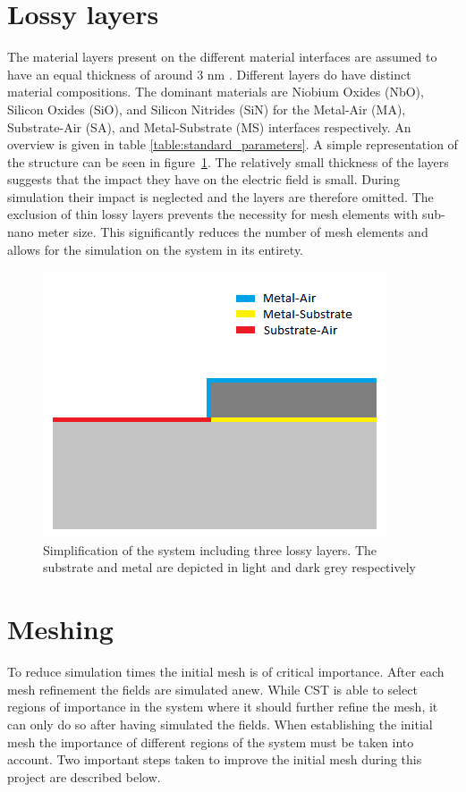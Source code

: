 \section{Lossy layers}
The material layers present on the different material interfaces are assumed to have an equal thickness of around 3 nm . Different layers do have distinct material compositions. The dominant materials are Niobium Oxides (NbO), Silicon Oxides (SiO), and Silicon Nitrides (SiN) for the Metal-Air (MA), Substrate-Air (SA), and Metal-Substrate (MS) interfaces respectively. An overview is given in table \ref{table:standard_parameters}.  A simple representation of the structure can be seen in figure~\ref{fig:model}.
The relatively small thickness of the layers suggests that the impact they have on the electric field is small. During simulation their impact is neglected and the layers are therefore omitted. The exclusion of thin lossy layers prevents the necessity for mesh elements with sub-nano meter size. This significantly reduces the number of mesh elements and allows for the simulation on the system in its entirety.
\begin{figure}
	\begin{center}
		\includegraphics[scale=.8]{Figures/model}
		\caption{Simplification of the system including three lossy layers. The substrate and metal are depicted in light and dark grey respectively}
		\label{fig:model}
	\end{center}
\end{figure}

\section{Meshing}
To reduce simulation times the initial mesh is of critical importance. After each mesh refinement the fields are simulated anew. While CST is able to select regions of importance in the system where it should further refine the mesh, it can only do so after having simulated the fields. When establishing the initial mesh the importance of different regions of the system must be taken into account. Two  important steps taken to improve the initial mesh during this project are described below.   



